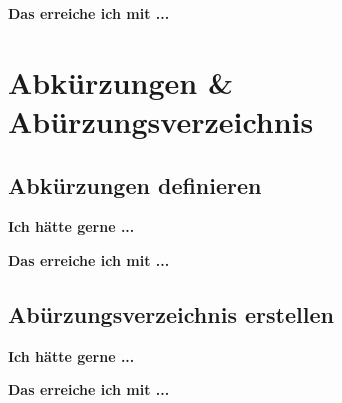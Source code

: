 \documentclass[twoside, 
               a4paper, 
               10pt, 
               parskip=full, 
               sectionentrydots=true, 
               listof=totoc, 
               listof=entryprefix,
               numbers=endperiod]{scrartcl}
\begin{document}
\newpage
{\textbf {Das erreiche ich mit ...}}
 
\begin{miniSeite}[colbacktitle=black!35!white,title=\LaTeX-Code]

\end{miniSeite}





\newpage
\section{Abkürzungen \& Abürzungsverzeichnis}
\subsection{Abkürzungen definieren}

{\textbf {Ich hätte gerne ...}}
 



\newpage
{\textbf {Das erreiche ich mit ...}}
 
\begin{miniSeite}[colbacktitle=black!35!white,title=\LaTeX-Code]

\end{miniSeite}




\newpage
\subsection{Abürzungsverzeichnis erstellen}
{\textbf {Ich hätte gerne ...}}
 
\begin{miniSeite}[colbacktitle=black!35!white,title=Ausdruck]

\end{miniSeite}


\newpage
{\textbf {Das erreiche ich mit ...}}
 
\begin{miniSeite}[colbacktitle=black!35!white,title=\LaTeX-Code]

\end{miniSeite}

\end{document}

